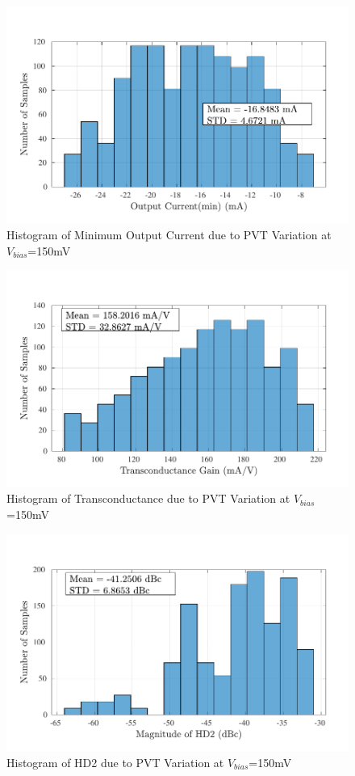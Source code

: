 \begin{figure} [H]
\centering
\includegraphics[scale=1]{Figures/Corners/Overall/PVT_Min/PDFs/PVT_Min_imin.pdf}
\caption{Histogram of Minimum Output Current due to PVT Variation at $V_{bias}$=150mV}
\end{figure}

\begin{figure} [H]
\centering
\includegraphics[scale=1]{Figures/Corners/Overall/PVT_Min/PDFs/PVT_Min_gm.pdf}
\caption{Histogram of Transconductance due to PVT Variation at $V_{bias}$=150mV}
\end{figure}

\begin{figure} [H]
\centering
\includegraphics[scale=1]{Figures/Corners/Overall/PVT_Min/PDFs/PVT_Min_hd2.pdf}
\caption{Histogram of HD2 due to PVT Variation at $V_{bias}$=150mV}
\end{figure}

